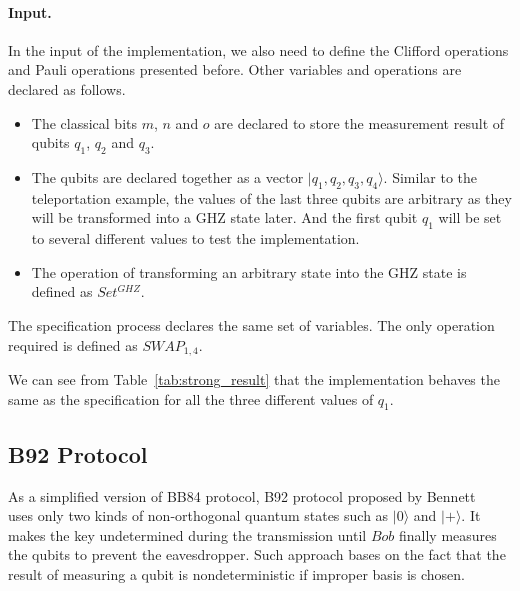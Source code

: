 \documentclass[runningheads]{llncs}
\begin{document}
\paragraph{Input.}
In the input of the implementation, we also need to define the Clifford operations and Pauli operations presented before. Other variables and operations are declared as follows.
\begin{itemize}
    \item The classical bits $m$, $n$ and $o$ are declared to store the measurement result of qubits $q_1$, $q_2$ and $q_3$.
    \item The qubits are declared together as a vector $|q_1,q_2,q_3,q_4\rangle$. Similar to the teleportation example, the values of the last three qubits are arbitrary as they will be transformed into a GHZ state later. And the first qubit $q_1$ will be set to several different values to test the implementation.
    \item The operation of transforming an arbitrary state into the GHZ state is defined as $Set^{GHZ}$.
\end{itemize}
The specification process declares the same set of variables. The only operation required is defined as $SWAP_{1,4}$.

We can see from Table~\ref{tab:strong_result} that the implementation behaves the same as the specification for all the three different values of $q_1$.

\subsection{B92 Protocol}
As a simplified version of BB84 protocol, B92 protocol proposed by Bennett~\cite{B92} uses only two kinds of non-orthogonal quantum states such as $|0\rangle$ and $|+\rangle$. It makes the key undetermined during the transmission until $Bob$ finally measures the qubits to prevent the eavesdropper. Such approach bases on the fact that the result of measuring a qubit is nondeterministic if improper basis is chosen.
\end{document}
